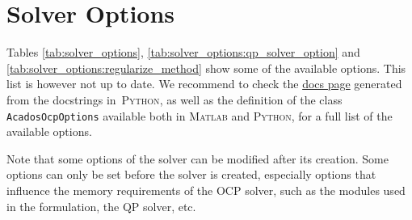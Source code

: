 \documentclass[english]{article}
\newcommand{\code}[1]{\texttt{#1}}
\newcommand{\matlab}{\textsc{Matlab}}
\newcommand{\python}{\textsc{Python}}
\begin{document}
\section{Solver Options}\label{sec:solver}


Tables \ref{tab:solver_options}, \ref{tab:solver_options:qp_solver_option} and \ref{tab:solver_options:regularize_method} show some of the available options.
This list is however not up to date.
We recommend to check the \href{https://docs.acados.org/python_interface/index.html#acados_template.acados_ocp_options.AcadosOcpOptions}{docs page} generated from the docstrings in~\python, as well as the definition of the class \code{AcadosOcpOptions} available both in \matlab{} and \python{}, for a full list of the available options.


Note that some options of the solver can be modified after its creation. Some options can only be set before the solver is created, especially options that influence the memory requirements of the OCP solver, such as the modules used in the formulation, the QP solver, etc.
\end{document}
